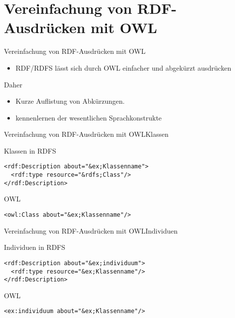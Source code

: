 \documentclass{beamer}
\begin{document}
\section{Vereinfachung von RDF-Ausdrücken mit OWL}
\begin{frame}[fragile]{Vereinfachung von RDF-Ausdrücken mit
OWL}
\begin{itemize}
\item RDF/RDFS lässt sich durch OWL einfacher und abgekürzt ausdrücken
\end{itemize}

\begin{block}{Daher}
\begin{itemize}
\item Kurze Auflistung von Abkürzungen.
\item kennenlernen der wesentlichen Sprachkonstrukte
\end{itemize}
\end{block}


\end{frame}
\begin{frame}[fragile]{Vereinfachung von RDF-Ausdrücken mit
OWL}{Klassen}
\begin{block}{Klassen in RDFS}
\begin{lstlisting}[lang="xml"]
<rdf:Description about="&ex;Klassenname">
  <rdf:type resource="&rdfs;Class"/>
</rdf:Description>
\end{lstlisting}
\end{block}
\begin{block}{OWL}
\begin{lstlisting}[lang="xml"]
<owl:Class about="&ex;Klassenname"/>
\end{lstlisting}
\end{block}

\end{frame}

\begin{frame}[fragile]{Vereinfachung von RDF-Ausdrücken mit
OWL}{Individuen}
\begin{block}{Individuen in RDFS}
\begin{lstlisting}[lang="xml"]
<rdf:Description about="&ex;individuum">
  <rdf:type resource="&ex;Klassenname"/>
</rdf:Description>
\end{lstlisting}
\end{block}
\begin{block}{OWL}
\begin{lstlisting}[lang="xml"]
<ex:individuum about="&ex;Klassenname"/>
\end{lstlisting}
\end{block}
\end{frame}
\end{document}
